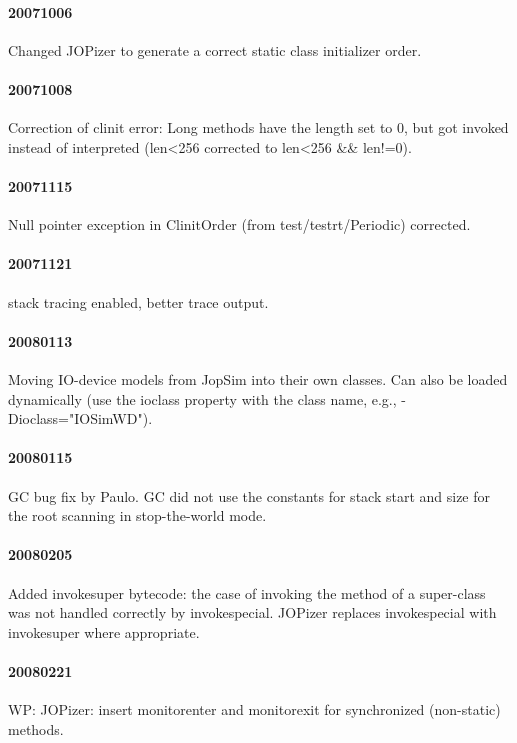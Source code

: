 \documentclass[a4paper,12pt]{scrartcl}
\newcommand{\code}[1]{{\textsf{#1}}}
\begin{document}
\paragraph{20071006} Changed JOPizer to generate a correct static
class initializer order.

\paragraph{20071008} Correction of clinit error: Long methods have
the length set to 0, but got invoked instead of interpreted (len<256
corrected to len<256 \&\& len!=0).

\paragraph{20071115} Null pointer exception in ClinitOrder
(from test/testrt/Periodic) corrected.

\paragraph{20071121} stack tracing enabled, better trace output.

\paragraph{20080113} Moving IO-device models from JopSim into their
own classes. Can also be loaded dynamically (use the \code{ioclass}
property with the class name, e.g., \code{-Dioclass="IOSimWD"}).

\paragraph{20080115} GC bug fix by Paulo. GC did not use the
constants for stack start and size for the root scanning in
stop-the-world mode.

\paragraph{20080205}

Added invokesuper bytecode: the case of invoking the method of a
super-class was not handled correctly by invokespecial. JOPizer
replaces invokespecial with invokesuper where appropriate.

\paragraph{20080221} WP: JOPizer: insert monitorenter and monitorexit for
synchronized (non-static) methods.
\end{document}
